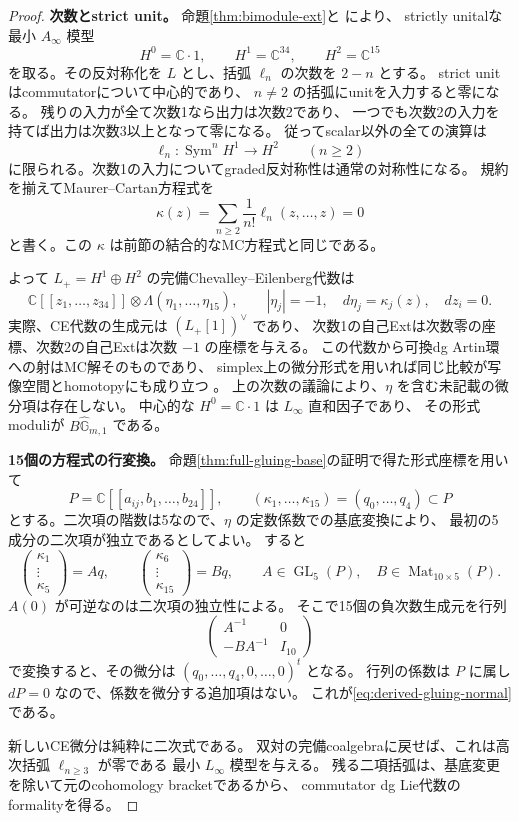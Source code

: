 \documentclass[a4paper,11pt]{ltjsarticle}
\theoremstyle{definition}
\newcommand{\CC}{\mathbb C}
\newcommand{\Sym}{\operatorname{Sym}}
\begin{document}
\begin{proof}
\textbf{次数とstrict unit。}
命題\ref{thm:bimodule-ext}と
\cite[Theorem 11.8, Proposition 11.10, Theorem 7.2]{ELOII}により、
strictly unitalな最小 $A_\infty$ 模型
\[
 H^0=\CC\cdot1,\qquad H^1=\CC^{34},\qquad H^2=\CC^{15}
\]
を取る。その反対称化を $L$ とし、括弧 $\ell_n$ の次数を $2-n$ とする。
strict unitはcommutatorについて中心的であり、
$n\ne2$ の括弧にunitを入力すると零になる。
残りの入力が全て次数1なら出力は次数2であり、
一つでも次数2の入力を持てば出力は次数3以上となって零になる。
従ってscalar以外の全ての演算は
\[
 \ell_n:\Sym^nH^1\longrightarrow H^2\qquad(n\ge2)
\]
に限られる。次数1の入力についてgraded反対称性は通常の対称性になる。
規約を揃えてMaurer--Cartan方程式を
\[
 \kappa(z)=\sum_{n\ge2}\frac1{n!}\ell_n(z,\ldots,z)=0
\]
と書く。この $\kappa$ は前節の結合的なMC方程式と同じである。

よって $L_+=H^1\oplus H^2$ の完備Chevalley--Eilenberg代数は
\begin{equation}\label{eq:derived-gluing-ce}
 \CC[[z_1,\ldots,z_{34}]]\otimes\Lambda(\eta_1,\ldots,\eta_{15}),
 \qquad |\eta_j|=-1,\quad d\eta_j=\kappa_j(z),\quad dz_i=0.
\end{equation}
実際、CE代数の生成元は $(L_+[1])^\vee$ であり、
次数1の自己Extは次数零の座標、次数2の自己Extは次数 $-1$ の座標を与える。
この代数から可換dg Artin環への射はMC解そのものであり、
simplex上の微分形式を用いれば同じ比較が写像空間とhomotopyにも成り立つ
\cite[Proposition 1.1, Section 4]{Getzler}。
上の次数の議論により、$\eta$ を含む未記載の微分項は存在しない。
中心的な $H^0=\CC\cdot1$ は $L_\infty$ 直和因子であり、
その形式moduliが $B\widehat{\mathbb G}_{m,1}$ である。

\textbf{15個の方程式の行変換。}
命題\ref{thm:full-gluing-base}の証明で得た形式座標を用いて
\[
 P=\CC[[a_{ij},b_1,\ldots,b_{24}]],\qquad
 (\kappa_1,\ldots,\kappa_{15})=(q_0,\ldots,q_4)\subset P
\]
とする。二次項の階数は5なので、$\eta$ の定数係数での基底変換により、
最初の5成分の二次項が独立であるとしてよい。
すると
\[
 \begin{pmatrix}\kappa_1\\ \vdots\\ \kappa_5\end{pmatrix}=Aq,
 \qquad
 \begin{pmatrix}\kappa_6\\ \vdots\\ \kappa_{15}\end{pmatrix}=Bq,
 \qquad A\in\operatorname{GL}_5(P),\quad B\in\operatorname{Mat}_{10\times5}(P).
\]
$A(0)$ が可逆なのは二次項の独立性による。
そこで15個の負次数生成元を行列
\[
 \begin{pmatrix}A^{-1}&0\\-BA^{-1}&I_{10}\end{pmatrix}
\]
で変換すると、その微分は $(q_0,\ldots,q_4,0,\ldots,0)^t$ となる。
行列の係数は $P$ に属し $dP=0$ なので、係数を微分する追加項はない。
これが\eqref{eq:derived-gluing-normal}である。

新しいCE微分は純粋に二次式である。
双対の完備coalgebraに戻せば、これは高次括弧 $\ell_{n\ge3}$ が零である
最小 $L_\infty$ 模型を与える。
残る二項括弧は、基底変更を除いて元のcohomology bracketであるから、
commutator dg Lie代数のformalityを得る。
\end{proof}
\end{document}
